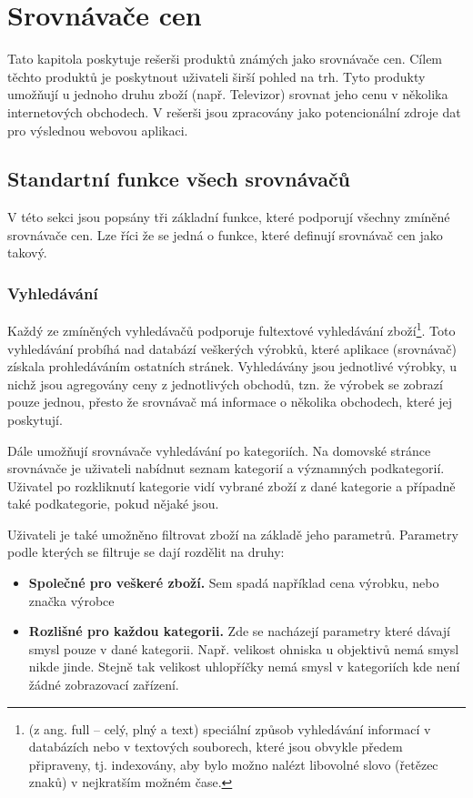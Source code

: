 \section{Srovnávače cen}
Tato kapitola poskytuje rešerši produktů známých jako srovnávače cen. Cílem těchto produktů je poskytnout uživateli širší pohled na trh. Tyto produkty umožňují u jednoho druhu zboží (např. Televizor) srovnat jeho cenu v několika internetových obchodech. V rešerši jsou zpracovány jako potencionální zdroje dat pro výslednou webovou aplikaci.

\subsection{Standartní funkce všech srovnávačů}
V této sekci jsou popsány tři základní funkce, které podporují všechny zmíněné srovnávače cen. Lze říci že se jedná o funkce, které definují srovnávač cen jako takový.

\subsubsection{Vyhledávání}
Každý ze zmíněných vyhledávačů podporuje fultextové vyhledávání zboží\footnote{(z ang. full – celý, plný a text) speciální způsob vyhledávání informací v databázích nebo v textových souborech, které jsou obvykle předem připraveny, tj. indexovány, aby bylo možno nalézt libovolné slovo (řetězec znaků) v nejkratším možném čase.}. Toto vyhledávání probíhá nad databází veškerých výrobků, které aplikace (srovnávač) získala prohledáváním ostatních stránek. Vyhledávány jsou jednotlivé výrobky, u nichž jsou agregovány ceny z jednotlivých obchodů, tzn. že výrobek se zobrazí pouze jednou, přesto že srovnávač má informace o několika obchodech, které jej poskytují.

Dále umožňují srovnávače vyhledávání po kategoriích. Na domovské stránce srovnávače je uživateli nabídnut seznam kategorií a významných podkategorií. Uživatel po rozkliknutí kategorie vidí vybrané zboží z dané kategorie a případně také podkategorie, pokud nějaké jsou.

Uživateli je také umožněno filtrovat zboží na základě jeho parametrů. Parametry podle kterých se filtruje se dají rozdělit na druhy:
\begin{itemize}
\item \textbf{Společné pro veškeré zboží.} Sem spadá například cena výrobku, nebo značka výrobce
\item \textbf{Rozlišné pro každou kategorii.} Zde se nacházejí parametry které dávají smysl pouze v dané kategorii. Např. velikost ohniska u objektivů nemá smysl nikde jinde. Stejně tak velikost uhlopříčky nemá smysl v kategoriích kde není žádné zobrazovací zařízení.
\end{itemize}

